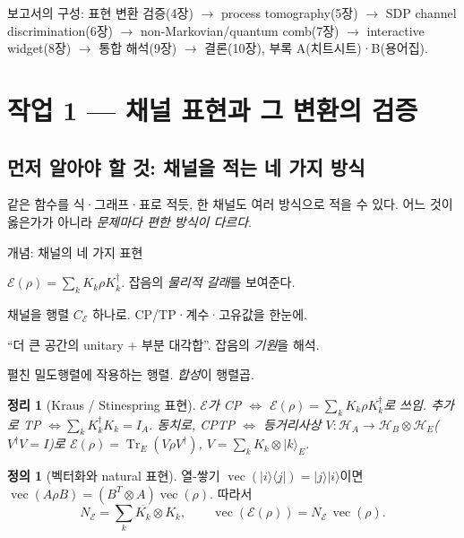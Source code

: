 \documentclass[11pt,a4paper]{article}
\newcommand{\E}{\mathcal{E}}
\newcommand{\Hcal}{\mathcal{H}}
\newcommand{\Tr}{\operatorname{Tr}}
\newcommand{\vecop}{\operatorname{vec}}
\theoremstyle{definition}
\newtheorem{definition}{정의}[section]
\theoremstyle{plain}
\newtheorem{theorem}{정리}[section]
\theoremstyle{remark}
\begin{document}
보고서의 구성: 표현 변환 검증(4장) $\to$ process tomography(5장) $\to$ SDP channel discrimination(6장) $\to$ non-Markovian/quantum comb(7장) $\to$ interactive widget(8장) $\to$ 통합 해석(9장) $\to$ 결론(10장), 부록 A(치트시트)·B(용어집).

\section{작업 1 --- 채널 표현과 그 변환의 검증}

\subsection{먼저 알아야 할 것: 채널을 적는 네 가지 방식}

같은 함수를 식·그래프·표로 적듯, 한 채널도 여러 방식으로 적을 수 있다. 어느 것이 옳은가가 아니라 \emph{문제마다 편한 방식이 다르다}.

\begin{conceptbox}{개념: 채널의 네 가지 표현}
\begin{description}[leftmargin=1.5em,style=nextline]
  \item[Kraus] $\E(\rho)=\sum_k K_k\rho K_k^\dagger$. 잡음의 \emph{물리적 갈래}를 보여준다.
  \item[Choi] 채널을 행렬 $C_\E$ 하나로. CP/TP·계수·고유값을 한눈에.
  \item[Stinespring] ``더 큰 공간의 unitary + 부분 대각합''. 잡음의 \emph{기원}을 해석.
  \item[Natural(Liouville)] 펼친 밀도행렬에 작용하는 행렬. \emph{합성}이 행렬곱.
\end{description}
\end{conceptbox}

\begin{theorem}[Kraus / Stinespring 표현]\label{thm:kraus}
$\E$가 CP $\iff$ $\E(\rho)=\sum_k K_k\rho K_k^\dagger$로 쓰임. 추가로 TP $\iff\sum_k K_k^\dagger K_k=I_A$. 동치로, CPTP $\iff$ 등거리사상 $V:\Hcal_A\to\Hcal_B\otimes\Hcal_E$($V^\dagger V=I$)로 $\E(\rho)=\Tr_E(V\rho V^\dagger)$, $V=\sum_k K_k\otimes|k\rangle_E$.
\end{theorem}

\begin{definition}[벡터화와 natural 표현]
열-쌓기 $\vecop(|i\rangle\langle j|)=|j\rangle|i\rangle$이면 $\vecop(A\rho B)=(B^T\otimes A)\vecop(\rho)$. 따라서
\[
N_\E=\sum_k\overline{K_k}\otimes K_k,\qquad \vecop(\E(\rho))=N_\E\,\vecop(\rho).
\]
\end{definition}
\end{document}
